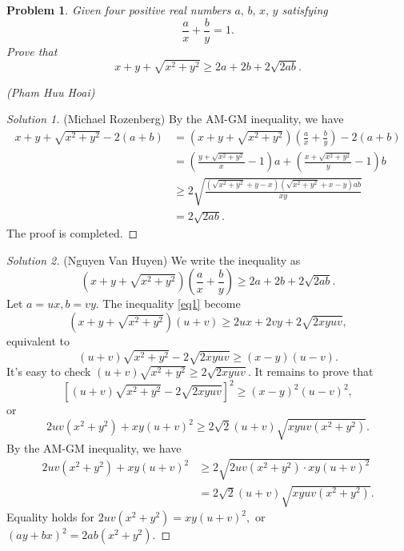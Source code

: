 \documentclass[12pt,a4paper]{book}
\theoremstyle{plain}
\newtheorem*{pro}{\cmss\problemColor Problem}
\begin{document}
\begin{pro}
Given four positive real numbers $a,\,b,\,x,\,y$ satisfying 
$$\frac{a}{x}+\frac{b}{y}=1.$$
Prove that
$$x+y+\sqrt{x^2+y^2} \ge 2a+2b+2\sqrt{2ab}.$$
\begin{flushright}
(Pham Huu Hoai) 
\end{flushright}
\end{pro}

\begin{proof}[\cmss\problemColor Solution 1] (Michael Rozenberg)
By the AM-GM inequality, we have
\[\begin{aligned}
x+y+\sqrt{x^2+y^2}-2(a+b)&=\left(x+y+\sqrt{x^2+y^2}\right)\left(\frac{a}{x}+\frac{b}{y}\right)-2(a+b)
\\&=\left(\frac{y+\sqrt{x^2+y^2}}{x}-1\right)a+\left(\frac{x+\sqrt{x^2+y^2}}{y}-1\right)b
\\&\geq2\sqrt{\frac{\left(\sqrt{x^2+y^2}+y-x\right)\left(\sqrt{x^2+y^2}+x-y\right)ab}{xy}}
\\&=2\sqrt{2ab}.
\end{aligned}\]
The proof is completed.
\end{proof}

\begin{proof}[\cmss\problemColor Solution 2]
(Nguyen Van Huyen) We write the inequality as
\begin{equation}\label{eq1}
\left(x+y+\sqrt{x^2+y^2}\right)\left(\frac{a}{x}+\frac{b}{y}\right) \geqslant 2a+2b+2\sqrt{2ab}.
\end{equation} 
Let $a=ux, b=vy.$ The inequality \eqref{eq1} become
\[(x+y+\sqrt{x^2+y^2})(u+v) \geqslant 2ux+2vy+2\sqrt{2xyuv},\]
equivalent to
\[(u+v)\sqrt{x^2+y^2} - 2\sqrt{2xyuv} \geqslant (x-y)(u-v).\]
It's easy to check $(u+v)\sqrt{x^2+y^2} \geqslant 2\sqrt{2xyuv}.$ It remains to prove that
\[ \left[(u+v)\sqrt{x^2+y^2} - 2\sqrt{2xyuv}\right]^2 \geqslant (x-y)^2(u-v)^2,\]
or
\[2uv\left(x^2+y^2\right)+x y(u+v)^2 \geqslant  2 \sqrt{2} (u+v)\sqrt{xyuv(x^2+y^2)}.\]
By the AM-GM inequality, we have
\[\begin{aligned}
2uv\left(x^2+y^2\right)+xy(u+v)^2 &\geqslant 2\sqrt{2uv\left(x^2+y^2\right)\cdot x y(u+v)^2} \\&=  2 \sqrt{2} (u+v)\sqrt{xyuv(x^2+y^2)}.
\end{aligned}\]
Equality holds for $2uv\left(x^2+y^2\right) = x y(u+v)^2,$ or $(ay+bx)^2 = 2ab(x^2+y^2).$
\end{proof}
\end{document}
